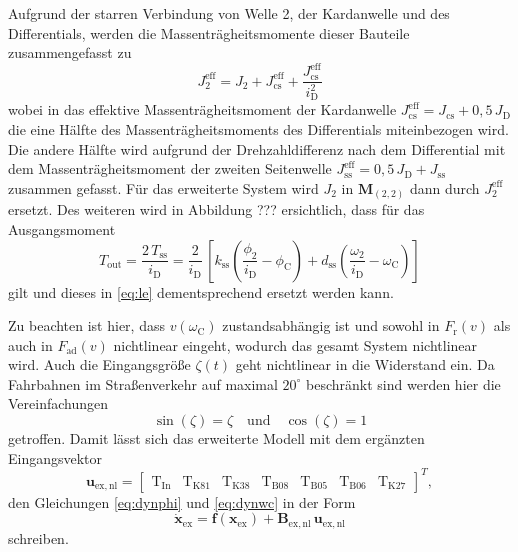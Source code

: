 Aufgrund der starren Verbindung von Welle 2, der Kardanwelle und des Differentials, werden die Massenträgheitsmomente dieser Bauteile zusammengefasst zu
\begin{equation}
J^\mathrm{eff}_2 = J_2 + J^\mathrm{eff}_\mathrm{cs} + \frac{J^\mathrm{eff}_\mathrm{cs}}{i_\mathrm{D}^2}
\end{equation}
wobei in das effektive Massenträgheitsmoment der Kardanwelle $J^\mathrm{eff}_\mathrm{cs} = J_\mathrm{cs} + 0,5\,J_\mathrm{D}$ die eine Hälfte des Massenträgheitsmoments des Differentials miteinbezogen wird. Die andere Hälfte wird aufgrund der Drehzahldifferenz nach dem Differential mit dem Massenträgheitsmoment der zweiten Seitenwelle $J^\mathrm{eff}_\mathrm{ss} =  0,5\,J_\mathrm{D} + J_\mathrm{ss}$ zusammen gefasst. Für das erweiterte System wird $J_2$ in $\pmb{M}_(2,2)$ dann durch $J^\mathrm{eff}_2$ ersetzt. Des weiteren wird in Abbildung ??? ersichtlich, dass für das Ausgangsmoment 
\begin{equation}
T_\mathrm{out} = \frac{2\,T_\mathrm{ss}}{i_\mathrm{D}} = \frac{2}{i_\mathrm{D}}\,\left[ k_\mathrm{ss}\left(\frac{\phi_2}{i_{\mathrm{D}}} - \phi_\mathrm{C}\right) + d_\mathrm{ss}\left(\frac{\omega_2}{i_{\mathrm{D}}} - \omega_\mathrm{C}\right)\right]
\end{equation}
gilt und dieses in \eqref{eq:le} dementsprechend ersetzt werden kann.

Zu beachten ist hier, dass $v(\omega_\mathrm{C})$ zustandsabhängig ist und sowohl in $F_\mathrm{r}(v)$ als auch in $F_\mathrm{ad}(v)$ nichtlinear eingeht, wodurch das gesamt System nichtlinear wird. Auch die Eingangsgröße $\zeta(t)$ geht nichtlinear in die Widerstand ein. Da Fahrbahnen im Straßenverkehr auf maximal $20^\circ$ beschränkt sind werden hier die Vereinfachungen
\begin{equation}
\sin(\zeta) = \zeta \quad \mathrm{und} \quad \cos(\zeta) = 1
\end{equation}  
getroffen. Damit lässt sich das erweiterte Modell mit dem ergänzten Eingangsvektor
\begin{equation}\label{eq:uex}
\pmb{u}_\mathrm{ex,nl} = \begin{bmatrix} \mathrm{T}_{\mathrm{In}} & \mathrm{T}_{\mathrm{K81}} & \mathrm{T}_{\mathrm{K38}} & \mathrm{T}_{\mathrm{B08}} & \mathrm{T}_{\mathrm{B05}} & \mathrm{T}_{\mathrm{B06}} & \mathrm{T}_{\mathrm{K27}}\end{bmatrix}^T,
\end{equation}
den Gleichungen \eqref{eq:dynphi} und \eqref{eq:dynwc} in der Form 
\begin{equation}\label{eq:sys_nl}
\dot{\pmb{x}}_\mathrm{ex} = \pmb{f}(\pmb{x}_\mathrm{ex}) + \pmb{B}_\mathrm{ex,nl}\,\pmb{u}_\mathrm{ex,nl}
\end{equation}
schreiben.

